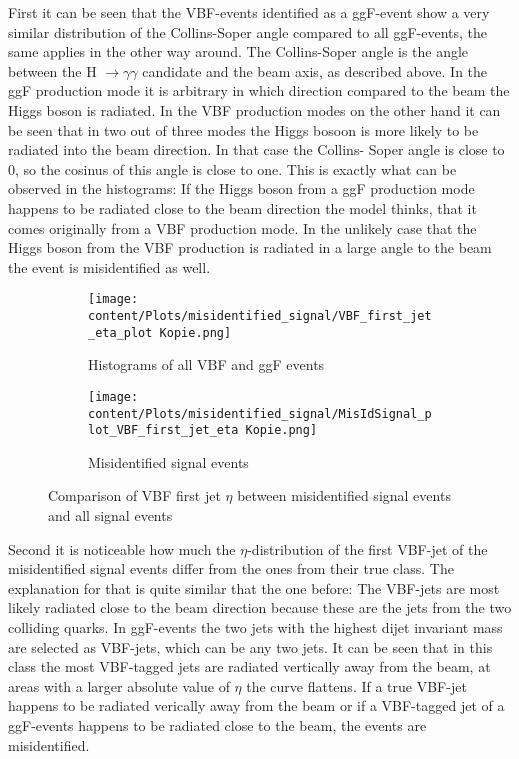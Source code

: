 First it can be seen that the VBF-events identified as a ggF-event show a very similar distribution of the Collins-Soper angle compared to all ggF-events, the same applies in the other way around.
The Collins-Soper angle is the angle between the H $\rightarrow \gamma \gamma$ candidate and the beam axis, as described above. In the ggF production mode it is arbitrary in which direction compared to the beam 
the Higgs boson is radiated. In the VBF production modes on the other hand it can be seen that in two out of three modes the Higgs bosoon is more likely to be radiated into the beam direction. In that case the Collins-
Soper angle is close to $0$, so the cosinus of this angle is close to one. This is exactly what can be observed in the histograms: If the Higgs boson from a ggF production mode happens to be radiated
close to the beam direction the model thinks, that it comes originally from a VBF production mode. In the unlikely case that the Higgs boson from the VBF production is radiated in a large angle to the beam the event is misidentified as well.

\begin{figure}[H]
    \centering
    \begin{subfigure}{0.45\textwidth}
        \centering
        \texttt{[image: content/Plots/misidentified\_signal/VBF\_first\_jet\_eta\_plot Kopie.png]}
        \caption{Histograms of all VBF and ggF events}
        \label{fig:roc1}
    \end{subfigure}
    \hfill
    \begin{subfigure}{0.45\textwidth}
        \centering
        \texttt{[image: content/Plots/misidentified\_signal/MisIdSignal\_plot\_VBF\_first\_jet\_eta Kopie.png]}
        \caption{Misidentified signal events}
        \label{fig:roc2}
    \end{subfigure}
    \caption{Comparison of VBF first jet $\eta$ between misidentified signal events and all signal events}
    \label{fig:combined_roc}
\end{figure}

Second it is noticeable how much the $\eta$-distribution of the first VBF-jet of the misidentified signal events differ from the ones from their true class. The explanation for that is quite similar that the one before:
The VBF-jets are most likely radiated close to the beam direction because these are the jets from the two colliding quarks. In ggF-events the two jets with the highest dijet invariant mass are
selected as VBF-jets, which can be any two jets. It can be seen that in this class the most VBF-tagged jets are radiated vertically away from the beam, at areas with a larger absolute value of $\eta$ the curve flattens.
If a true VBF-jet happens to be radiated verically away from the beam or if a VBF-tagged jet of a ggF-events happens to be radiated close to the beam, the events are misidentified.

